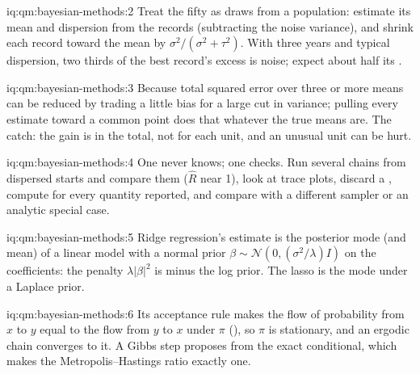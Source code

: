 \begin{solution}{iq:qm:bayesian-methods:2}
Treat the fifty as draws from a population: estimate its mean and dispersion from the records (subtracting the noise variance), and shrink
each record toward the mean by $\sigma^2/(\sigma^2 + \tau^2)$. With three years and typical dispersion, two thirds of the best record's
excess is noise; expect about half its .
\end{solution}

\begin{solution}{iq:qm:bayesian-methods:3}
Because total squared error over three or more means can be reduced by trading a little bias for a large cut in variance; pulling every
estimate toward a common point does that whatever the true means are. The catch: the gain is in the total, not for each unit, and an
unusual unit can be hurt.
\end{solution}

\begin{solution}{iq:qm:bayesian-methods:4}
One never knows; one checks. Run several chains from dispersed starts and compare them ($\hat R$ near 1), look at trace plots, discard a
, compute  for every quantity reported, and compare with a different sampler or an analytic special case.
\end{solution}

\begin{solution}{iq:qm:bayesian-methods:5}
Ridge regression's estimate is the posterior mode (and mean) of a linear model with a normal prior $\beta \sim \mathcal N(0, (\sigma^2/\lambda)I)$ on
the coefficients: the penalty $\lambda\lvert\beta\rvert^2$ is minus the log prior. The lasso is the mode under a Laplace prior.
\end{solution}

\begin{solution}{iq:qm:bayesian-methods:6}
Its acceptance rule makes the flow of probability from $x$ to $y$ equal to the flow from $y$ to $x$ under $\pi$ (), so $\pi$ is
stationary, and an ergodic chain converges to it. A Gibbs step proposes from the exact conditional, which makes the Metropolis--Hastings
ratio exactly one.
\end{solution}
